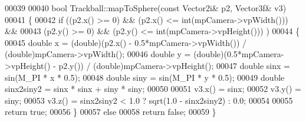 \begin{DoxyCode}
00039 
00040 \textcolor{keywordtype}{bool} Trackball::mapToSphere(\textcolor{keyword}{const} Vector2i& p2, Vector3f& v3)
00041 \{
00042   \textcolor{keywordflow}{if} ((p2.x() >= 0) && (p2.x() <= int(mpCamera->vpWidth())) &&
00043       (p2.y() >= 0) && (p2.y() <= int(mpCamera->vpHeight())) )
00044   \{
00045     \textcolor{keywordtype}{double} x  = (double)(p2.x() - 0.5*mpCamera->vpWidth())  / (\textcolor{keywordtype}{double})mpCamera->vpWidth();
00046     \textcolor{keywordtype}{double} y  = (double)(0.5*mpCamera->vpHeight() - p2.y()) / (\textcolor{keywordtype}{double})mpCamera->vpHeight();
00047     \textcolor{keywordtype}{double} sinx         = sin(M\_PI * x * 0.5);
00048     \textcolor{keywordtype}{double} siny         = sin(M\_PI * y * 0.5);
00049     \textcolor{keywordtype}{double} sinx2siny2   = sinx * sinx + siny * siny;
00050 
00051     v3.x() = sinx;
00052     v3.y() = siny;
00053     v3.z() = sinx2siny2 < 1.0 ? sqrt(1.0 - sinx2siny2) : 0.0;
00054 
00055     \textcolor{keywordflow}{return} \textcolor{keyword}{true};
00056   \}
00057   \textcolor{keywordflow}{else}
00058     \textcolor{keywordflow}{return} \textcolor{keyword}{false};
00059 \}
\end{DoxyCode}
